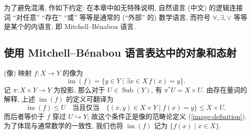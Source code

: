 \begin{remark}
	{}
		为了避免混淆, 作如下约定: 在本章中如无特殊说明, 自然语言 (中文) 的逻辑连接词 ``对任意'' ``存在'' ``或'' 等等是通常的 (``外部'' 的) 数学语言,
	而符号 $\forall,\exists,\lor$ 等等是某个\topos{}的内语言, 即 Mitchell--B\'enabou 语言.
\end{remark}

\subsection{使用 Mitchell--B\'enabou 语言表达\topos{}中的对象和态射}

\begin{example}
	[label={image-internal-definition}]
	{(像)}
	映射 $f\colon X\to Y$ 的像为
	\[
	\operatorname{im}(f) = \{y\in Y\mid \exists x\in X\, f(x) = y\}.
	\]
	记 $\pi\colon X\times Y\to Y$ 为投影, 那么对于 $U\in\operatorname{Sub}(Y)$, 有 $\pi^* U=X\times U$.
	由存在量词的解释, 上述 $\operatorname{im}(f)$ 的定义可翻译为
	\[
	\operatorname{im}(f)\leq U \quad \text{当且仅当} \quad \{(x,y)\in X\times Y \mid f(x)=y\} \leq X\times U.
	\]
	而后者等价于 $f$ 穿过 $U\hookrightarrow Y$; 故这个条件正是像的范畴论定义 (\ref{image-definition}).
	为了体现与通常数学的一致性, 我们也将 $\operatorname{im}(f)$ 记为 $\{f(x)\mid x\in X\}$.
\end{example}


